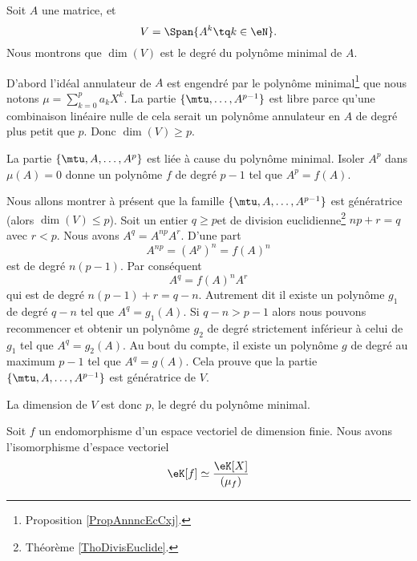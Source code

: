 \begin{example}
    Soit \( A\) une matrice, et 
    \begin{equation}
        V=\Span\{A^k\tq k\in \eN \}.
    \end{equation}
    Nous montrons que \( \dim(V)\) est le degré du polynôme minimal de \( A\).

    D'abord l'idéal annulateur de \( A\) est engendré par le polynôme minimal\footnote{Proposition \ref{PropAnnncEcCxj}.} que nous notons
        $\mu=\sum_{k=0}^pa_kX^k$.
    La partie \( \{ \mtu,\ldots, A^{p-1} \}\) est libre parce qu'une combinaison linéaire nulle de cela serait un polynôme annulateur en \( A\) de degré plus petit que \( p\). Donc \( \dim(V)\geq p\).

    La partie \( \{ \mtu,A,\ldots, A^p \}\) est liée à cause du polynôme minimal. Isoler \( A^p\) dans \( \mu(A)=0\) donne un polynôme \( f\) de degré \( p-1\) tel que \( A^p=f(A)\).

    Nous allons montrer à présent que la famille \( \{ \mtu,A,\ldots, A^{p-1} \}\) est génératrice (alors \( \dim(V)\leq p\)). Soit un entier \( q\geq p\)et de division euclidienne\footnote{Théorème \ref{ThoDivisEuclide}.} \( np+r=q\) avec \( r<p\). Nous avons \( A^q=A^{np}A^r\). D'une part
    \begin{equation}
        A^{np}=(A^p)^n=f(A)^n
    \end{equation}
    est de degré \( n(p-1)\). Par conséquent
    \begin{equation}
        A^q=f(A)^nA^r
    \end{equation}
    qui est de degré \( n(p-1)+r=q-n\). Autrement dit il existe un polynôme \( g_1\) de degré \( q-n\) tel que \( A^q=g_1(A)\). Si \( q-n>p-1\) alors nous pouvons recommencer et obtenir un polynôme \( g_2\) de degré strictement inférieur à celui de \( g_1\) tel que \( A^q=g_2(A)\). Au bout du compte, il existe un polynôme \( g\) de degré au maximum \( p-1\) tel que \( A^q=g(A)\). Cela prouve que la partie \( \{ \mtu,A,\ldots, A^{p-1} \}\) est génératrice de \( V\).

    La dimension de \( V\) est donc \( p\), le degré du polynôme minimal.
\end{example}

\begin{proposition}     \label{PropooCFZDooROVlaA}
    Soit \( f\) un endomorphisme d'un espace vectoriel de dimension finie. Nous avons l'isomorphisme d'espace vectoriel
    \begin{equation}
        \eK[f]\simeq\frac{ \eK[X] }{ (\mu_f) }
    \end{equation}
\end{proposition}

